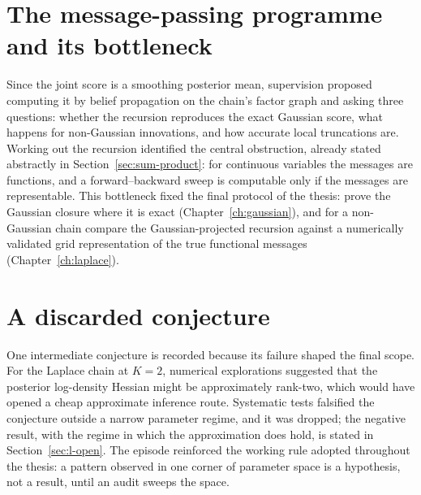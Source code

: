\section{The message-passing programme and its bottleneck}
\label{sec:dev-bottleneck}

Since the joint score is a smoothing posterior mean, supervision
proposed computing it by belief propagation on the chain's factor graph
and asking three questions: whether the recursion reproduces the exact
Gaussian score, what happens for non-Gaussian innovations, and how
accurate local truncations are. Working out the recursion identified the
central obstruction, already stated abstractly in
Section~\ref{sec:sum-product}: for continuous variables the messages
are functions, and a forward--backward sweep is computable only if the
messages are representable. This bottleneck fixed the final protocol of
the thesis: prove the Gaussian closure where it is exact
(Chapter~\ref{ch:gaussian}), and for a non-Gaussian chain compare the
Gaussian-projected recursion against a numerically validated grid
representation of the true functional messages
(Chapter~\ref{ch:laplace}).

\section{A discarded conjecture}\label{sec:dev-discarded}

One intermediate conjecture is recorded because its failure shaped the
final scope. For the Laplace chain at $K = 2$, numerical explorations
suggested that the posterior log-density Hessian might be approximately
rank-two, which would have opened a cheap approximate inference route.
Systematic tests falsified the conjecture outside a narrow parameter
regime, and it was dropped; the negative result, with the regime in
which the approximation does hold, is stated in
Section~\ref{sec:l-open}. The episode reinforced the working rule
adopted throughout the thesis: a pattern observed in one corner of
parameter space is a hypothesis, not a result, until an audit sweeps the
space.
